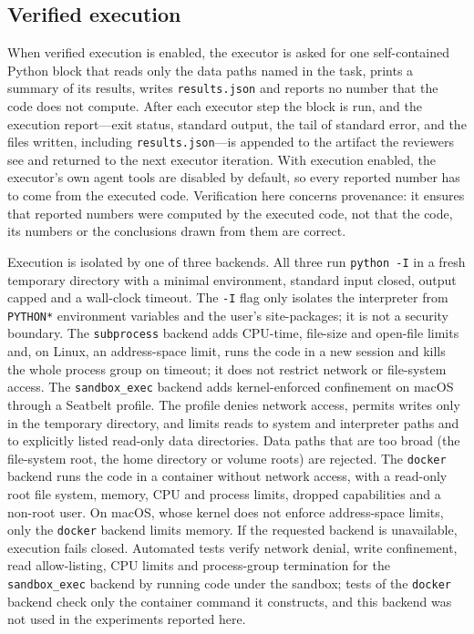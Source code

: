 \subsection*{Verified execution}

When verified execution is enabled, the executor is asked for one self-contained Python block that reads only the data paths named in the task, prints a summary of its results, writes \texttt{results.json} and reports no number that the code does not compute. After each executor step the block is run, and the execution report---exit status, standard output, the tail of standard error, and the files written, including \texttt{results.json}---is appended to the artifact the reviewers see and returned to the next executor iteration. With execution enabled, the executor's own agent tools are disabled by default, so every reported number has to come from the executed code. Verification here concerns provenance: it ensures that reported numbers were computed by the executed code, not that the code, its numbers or the conclusions drawn from them are correct.

Execution is isolated by one of three backends. All three run \texttt{python -I} in a fresh temporary directory with a minimal environment, standard input closed, output capped and a wall-clock timeout. The \texttt{-I} flag only isolates the interpreter from \texttt{PYTHON*} environment variables and the user's site-packages; it is not a security boundary. The \texttt{subprocess} backend adds CPU-time, file-size and open-file limits and, on Linux, an address-space limit, runs the code in a new session and kills the whole process group on timeout; it does not restrict network or file-system access. The \texttt{sandbox\_exec} backend adds kernel-enforced confinement on macOS through a Seatbelt profile. The profile denies network access, permits writes only in the temporary directory, and limits reads to system and interpreter paths and to explicitly listed read-only data directories. Data paths that are too broad (the file-system root, the home directory or volume roots) are rejected. The \texttt{docker} backend runs the code in a container without network access, with a read-only root file system, memory, CPU and process limits, dropped capabilities and a non-root user. On macOS, whose kernel does not enforce address-space limits, only the \texttt{docker} backend limits memory. If the requested backend is unavailable, execution fails closed. Automated tests verify network denial, write confinement, read allow-listing, CPU limits and process-group termination for the \texttt{sandbox\_exec} backend by running code under the sandbox; tests of the \texttt{docker} backend check only the container command it constructs, and this backend was not used in the experiments reported here.

